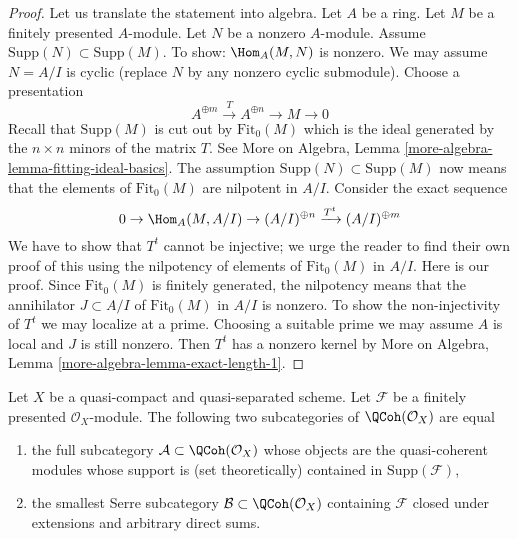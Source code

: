 \begin{proof}
Let us translate the statement into algebra. Let $A$ be a ring. Let $M$ be a
finitely presented $A$-module. Let $N$ be a nonzero $A$-module. Assume
$\text{Supp}(N) \subset \text{Supp}(M)$. To show: $\Hom_A(M, N)$ is nonzero.
We may assume $N = A/I$ is cyclic (replace $N$ by any nonzero
cyclic submodule). Choose a presentation
$$
A^{\oplus m} \xrightarrow{T} A^{\oplus n} \to M \to 0
$$
Recall that $\text{Supp}(M)$ is cut out by $\text{Fit}_0(M)$ which
is the ideal generated by the $n \times n$ minors of the matrix $T$.
See More on Algebra, Lemma \ref{more-algebra-lemma-fitting-ideal-basics}.
The assumption $\text{Supp}(N) \subset \text{Supp}(M)$ now means that
the elements of $\text{Fit}_0(M)$ are nilpotent in $A/I$.
Consider the exact sequence
$$
0 \to \Hom_A(M, A/I) \to (A/I)^{\oplus n} \xrightarrow{T^t} (A/I)^{\oplus m}
$$
We have to show that $T^t$ cannot be injective; we urge the reader to
find their own proof of this using the nilpotency of elements of
$\text{Fit}_0(M)$ in $A/I$. Here is our proof.
Since $\text{Fit}_0(M)$ is finitely generated, the nilpotency means that
the annihilator $J \subset A/I$ of $\text{Fit}_0(M)$ in $A/I$ is nonzero.
To show the non-injectivity of $T^t$ we may localize at a prime.
Choosing a suitable prime we may assume $A$ is local and $J$ is still
nonzero. Then $T^t$ has a nonzero kernel by
More on Algebra, Lemma \ref{more-algebra-lemma-exact-length-1}.
\end{proof}

\begin{lemma}
\label{lemma-supported-on-support}
Let $X$ be a quasi-compact and quasi-separated scheme.
Let $\mathcal{F}$ be a finitely presented $\mathcal{O}_X$-module.
The following two subcategories of $\QCoh(\mathcal{O}_X)$ are equal
\begin{enumerate}
\item the full subcategory $\mathcal{A} \subset \QCoh(\mathcal{O}_X)$
whose objects are the quasi-coherent modules
whose support is (set theoretically) contained in $\text{Supp}(\mathcal{F})$,
\item the smallest Serre subcategory $\mathcal{B} \subset \QCoh(\mathcal{O}_X)$
containing
$\mathcal{F}$ closed under extensions and arbitrary direct sums.
\end{enumerate}
\end{lemma}

